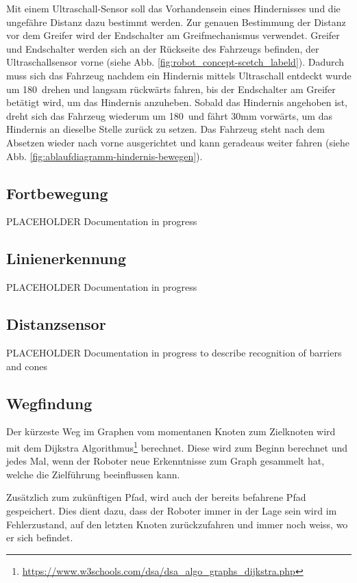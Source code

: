  Mit einem Ultraschall-Sensor soll das Vorhandensein eines Hindernisses und die ungefähre Distanz dazu bestimmt werden. Zur genauen Bestimmung der Distanz vor dem Greifer wird der Endschalter am Greifmechanismus verwendet.
Greifer und Endschalter werden sich an der Rückseite des Fahrzeugs befinden, der Ultraschallsensor vorne (siehe Abb. \ref{fig:robot_concept-scetch_labeld}). Dadurch muss sich das Fahrzeug nachdem ein Hindernis mittels Ultraschall entdeckt wurde um 180\textdegree\ drehen und langsam rückwärts fahren, bis der Endschalter am Greifer betätigt wird, um das Hindernis anzuheben. Sobald das Hindernis angehoben ist, dreht sich das Fahrzeug wiederum um 180\textdegree\ und fährt 30mm vorwärts, um das Hindernis an dieselbe Stelle zurück zu setzen. Das Fahrzeug steht nach dem Absetzen wieder nach vorne ausgerichtet und kann geradeaus weiter fahren (siehe  Abb. \ref{fig:ablaufdiagramm-hindernis-bewegen}).


\subsection{Fortbewegung}

PLACEHOLDER Documentation in progress

\subsection{Linienerkennung}

PLACEHOLDER Documentation in progress

\subsection{Distanzsensor}

PLACEHOLDER Documentation in progress to describe recognition of barriers and cones

\subsection{Wegfindung}

Der kürzeste Weg im Graphen vom momentanen Knoten zum Zielknoten wird mit dem Dijkstra Algorithmus\footnote{\url{https://www.w3schools.com/dsa/dsa\_algo\_graphs\_dijkstra.php}} berechnet. Diese wird zum Beginn berechnet und jedes Mal, wenn der Roboter neue Erkenntnisse zum Graph gesammelt hat, welche die Zielführung beeinflussen kann.

Zusätzlich zum zukünftigen Pfad, wird auch der bereits befahrene Pfad gespeichert. Dies dient dazu, dass der Roboter immer in der Lage sein wird im Fehlerzustand, auf den letzten Knoten zurückzufahren und immer noch weiss, wo er sich befindet.

